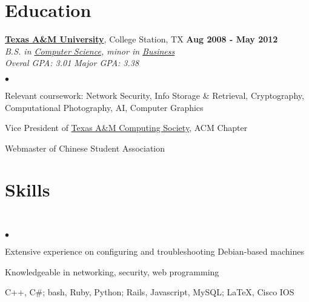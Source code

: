 \documentclass[margin,line]{res}
\newenvironment{list2}
  {\vspace{-4mm}
   \begin{list}{$\bullet$}{
     \setlength{\itemsep}{0in}
     \setlength{\parsep}{0in} \setlength{\parskip}{0in}
     \setlength{\topsep}{0in} \setlength{\partopsep}{0in}
     \setlength{\leftmargin}{0.18in}}}
  {\end{list}}
\begin{document}
\begin{resume}
\section{\sc Education}
{\bf \href{http://tamu.edu}{Texas A\&M University}}, College Station, TX \hfill {\bf Aug 2008 - May 2012} \\
{\em B.S. in \href{http://cs.tamu.edu}{Computer Science}, minor in \href{http://mays.tamu.edu}{Business}} \\
{\em Overal GPA: 3.01 \hspace{5mm} Major GPA: 3.38} \\
\begin{list2}
\item Relevant coursework: Network Security, Info Storage \& Retrieval,
 Cryptography, Computational Photography, AI, Computer Graphics
\item Vice President of \href{http://tacs.tamu.edu}{Texas A\&M Computing Society}, ACM Chapter
\item Webmaster of Chinese Student Association
\end{list2}



%
%
\section{\sc Skills} 
\textcolor{white}{.}
\begin{list2}
\item Extensive experience on configuring and troubleshooting Debian-based machines
\item Knowledgeable in networking, security, web programming
\item C++, C\#; bash, Ruby, Python; Rails, Javascript, MySQL; \LaTeX, Cisco IOS
\end{list2}



\end{resume}
\end{document}
